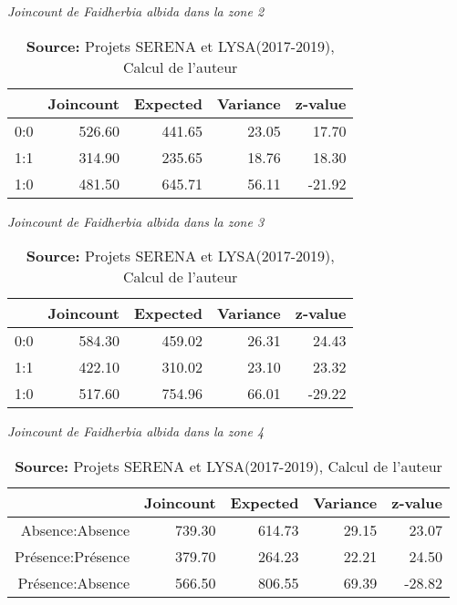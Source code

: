 \documentclass[a4paper, oneside, 12pt]{book}
\begin{document}
\begin{table}[H]
	\centering
	\caption{\textit{Joincount de Faidherbia albida dans la zone 2}}
	\begin{tabular}{|r|r|r|r|r|}
		\hline
		& Joincount & Expected & Variance & z-value \\ 
		\hline
		0:0 & 526.60 & 441.65 & 23.05 & 17.70 \\
		\hline 
		1:1 & 314.90 & 235.65 & 18.76 & 18.30 \\ 
		\hline
		1:0 & 481.50 & 645.71 & 56.11 & -21.92 \\  
		\hline
	\end{tabular}
\caption*{\textbf{Source: }Projets SERENA et LYSA(2017-2019), Calcul de l'auteur}
\end{table}
\begin{table}[H]
	\centering
	\caption{\textit{Joincount de Faidherbia albida dans la zone 3}}
	\begin{tabular}{|r|r|r|r|r|}
		\hline
		& Joincount & Expected & Variance & z-value \\ 
		\hline
		0:0 & 584.30 & 459.02 & 26.31 & 24.43 \\ 
		\hline
		1:1 & 422.10 & 310.02 & 23.10 & 23.32 \\ 
		\hline
		1:0 & 517.60 & 754.96 & 66.01 & -29.22 \\ 
		\hline
	\end{tabular}
\caption*{\textbf{Source: }Projets SERENA et LYSA(2017-2019), Calcul de l'auteur}
\end{table}
\begin{table}[H]
	\centering
	\caption{\textit{Joincount de Faidherbia albida dans la zone 4}}
	\begin{tabular}{|r|r|r|r|r|}
		\hline
		& Joincount & Expected & Variance & z-value \\ 
		\hline
		Absence:Absence & 739.30 & 614.73 & 29.15 & 23.07 \\ 
		\hline
		Présence:Présence & 379.70 & 264.23 & 22.21 & 24.50 \\ 
		\hline
		Présence:Absence & 566.50 & 806.55 & 69.39 & -28.82 \\  
		\hline
	\end{tabular}
\caption*{\textbf{Source: }Projets SERENA et LYSA(2017-2019), Calcul de l'auteur}
\end{table}
\end{document}

